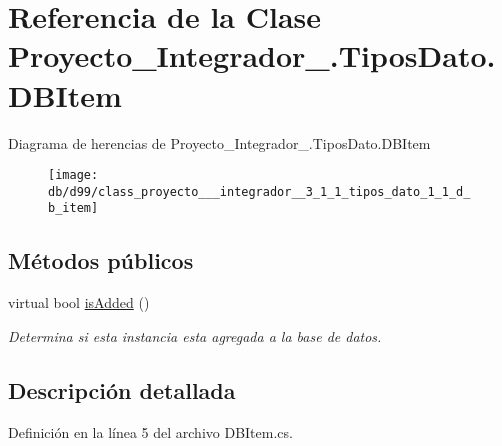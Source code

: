 \hypertarget{class_proyecto___integrador__3_1_1_tipos_dato_1_1_d_b_item}{\section{Referencia de la Clase Proyecto\-\_\-\-Integrador\-\_.\-Tipos\-Dato.\-D\-B\-Item}
\label{class_proyecto___integrador__3_1_1_tipos_dato_1_1_d_b_item}
}
Diagrama de herencias de Proyecto\-\_\-\-Integrador\-\_.\-Tipos\-Dato.\-D\-B\-Item\begin{figure}[H]
\begin{center}
\leavevmode
\texttt{[image: db/d99/class\_proyecto\_\_\_integrador\_\_3\_1\_1\_tipos\_dato\_1\_1\_d\_b\_item]}
\end{center}
\end{figure}
\subsection*{Métodos públicos}
\begin{DoxyCompactItemize}
\item 
virtual bool \hyperlink{class_proyecto___integrador__3_1_1_tipos_dato_1_1_d_b_item_ab88d7eef0fa58d7d5fdf40039867dd6e}{is\-Added} ()
\begin{DoxyCompactList}\small\item\em Determina si esta instancia esta agregada a la base de datos. \end{DoxyCompactList}\end{DoxyCompactItemize}


\subsection{Descripción detallada}


Definición en la línea 5 del archivo D\-B\-Item.\-cs.



